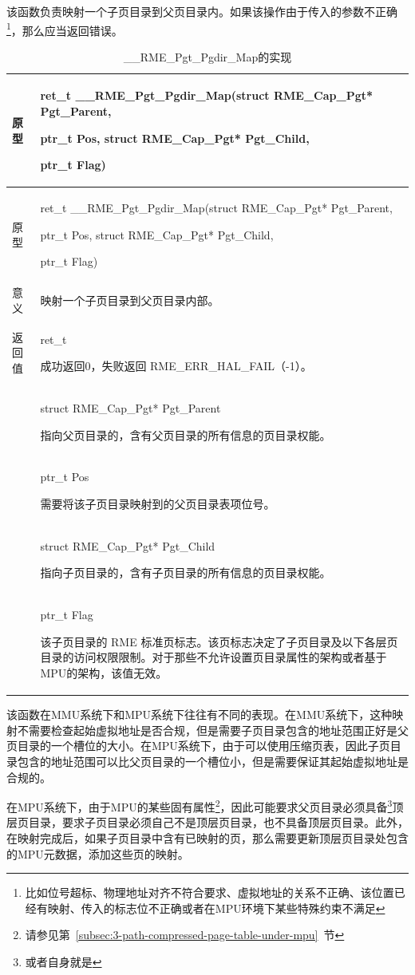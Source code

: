 该函数负责映射一个子页目录到父页目录内。如果该操作由于传入的参数不正确\footnote{比如位号超标、物理地址对齐不符合要求、虚拟地址的关系不正确、该位置已经有映射、传入的标志位不正确或者在MPU环境下某些特殊约束不满足}，那么应当返回错误。

\begin{xltabular}{\textwidth}{@{}>{\hsize\raggedright\arraybackslash}X>{\hsize\raggedright\arraybackslash}X@{}}
\caption{\_\_RME\_Pgt\_Pgdir\_Map的实现}\label{tab:7-81-rme-pgt-pgdir-map-implementation}\\
\toprule
原型\strut
 & ret\_t \_\_RME\_Pgt\_Pgdir\_Map(struct RME\_Cap\_Pgt* Pgt\_Parent,

ptr\_t Pos, struct RME\_Cap\_Pgt* Pgt\_Child,

ptr\_t Flag)\strut
\tabularnewline
\endfirsthead
\toprule
原型\strut
 & ret\_t \_\_RME\_Pgt\_Pgdir\_Map(struct RME\_Cap\_Pgt* Pgt\_Parent,

ptr\_t Pos, struct RME\_Cap\_Pgt* Pgt\_Child,

ptr\_t Flag)\strut
\tabularnewline
\midrule
\endhead
\bottomrule
\endlastfoot
意义 & 映射一个子页目录到父页目录内部。\tabularnewline
返回值\strut
 & ret\_t

成功返回0，失败返回 RME\_ERR\_HAL\_FAIL（-1）。\strut
\tabularnewline
{} & struct RME\_Cap\_Pgt* Pgt\_Parent

指向父页目录的，含有父页目录的所有信息的页目录权能。\strut
\tabularnewline
\strut
 & ptr\_t Pos

需要将该子页目录映射到的父页目录表项位号。\strut
\tabularnewline
\strut
 & struct RME\_Cap\_Pgt* Pgt\_Child

指向子页目录的，含有子页目录的所有信息的页目录权能。\strut
\tabularnewline
\strut
 & ptr\_t Flag

该子页目录的 RME 标准页标志。该页标志决定了子页目录及以下各层页目录的访问权限限制。对于那些不允许设置页目录属性的架构或者基于MPU的架构，该值无效。\strut
\tabularnewline
\end{xltabular}

该函数在MMU系统下和MPU系统下往往有不同的表现。在MMU系统下，这种映射不需要检查起始虚拟地址是否合规，但是需要子页目录包含的地址范围正好是父页目录的一个槽位的大小。在MPU系统下，由于可以使用压缩页表，因此子页目录包含的地址范围可以比父页目录的一个槽位小，但是需要保证其起始虚拟地址是合规的。

在MPU系统下，由于MPU的某些固有属性\footnote{请参见第~\ref{subsec:3-path-compressed-page-table-under-mpu}~节}，因此可能要求父页目录必须具备\footnote{或者自身就是}顶层页目录，要求子页目录必须自己不是顶层页目录，也不具备顶层页目录。此外，在映射完成后，如果子页目录中含有已映射的页，那么需要更新顶层页目录处包含的MPU元数据，添加这些页的映射。

